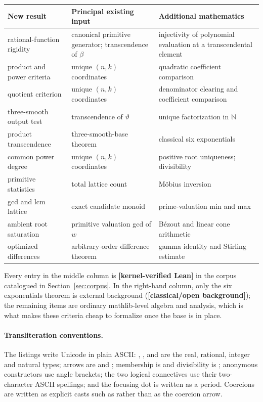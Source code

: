 \documentclass[11pt,oneside]{article}
\theoremstyle{definition}
\theoremstyle{remark}
\newcommand{\N}{\mathbb N}
\newcommand{\thetaq}{\vartheta}
\newcommand{\lean}[1]{\texttt{\detokenize{#1}}}
\newcommand{\statuslean}{\textcolor{leanblue}{\textbf{[kernel-verified Lean]}}}
\newcommand{\statusknown}{\textcolor{classicalgray}{\textbf{[classical/open background]}}}
\begin{document}
\begin{center}
\small
\begin{tabular}{@{}p{}p{}p{}@{}}
\toprule
New result & Principal existing input & Additional mathematics \\
\midrule
rational-function rigidity &
canonical primitive generator; transcendence of $\beta$ &
injectivity of polynomial evaluation at a transcendental element \\
\addlinespace
product and power criteria &
unique $(n,k)$ coordinates &
quadratic coefficient comparison \\
\addlinespace
quotient criterion &
unique $(n,k)$ coordinates &
denominator clearing and coefficient comparison \\
\addlinespace
three-smooth output test &
transcendence of $\thetaq$ &
unique factorization in $\N$ \\
\addlinespace
product transcendence &
three-smooth-base theorem &
classical six exponentials \\
\addlinespace
common power degree &
unique $(n,k)$ coordinates &
positive root uniqueness; divisibility \\
\addlinespace
primitive statistics &
total lattice count &
M\"obius inversion \\
\addlinespace
gcd and lcm lattice &
exact candidate monoid &
prime-valuation min and max \\
\addlinespace
ambient root saturation &
primitive valuation gcd of $w$ &
B\'ezout and linear cone arithmetic \\
\addlinespace
optimized differences &
arbitrary-order difference theorem &
gamma identity and Stirling estimate \\
\bottomrule
\end{tabular}
\end{center}

Every entry in the middle column is \statuslean{} in the corpus catalogued in
Section~\ref{sec:corpus}.  In the right-hand column, only the six exponentials theorem is
external background (\statusknown); the remaining items are ordinary mathlib-level algebra
and analysis, which is what makes these criteria cheap to formalize once the base is in
place.

\paragraph{Transliteration conventions.}
The listings write Unicode in plain ASCII: \lean{R}, \lean{Q}, \lean{Z} and \lean{N} are the
real, rational, integer and natural types; arrows are \lean{->} and \lean{<->}; membership is
\lean{in} and divisibility is \lean{dvd}; anonymous constructors use angle brackets; the two
logical connectives use their two-character ASCII spellings; and the focusing dot is written
as a period.  Coercions are written as explicit casts such as \lean{Int.cast} rather than as
the coercion arrow.
\end{document}
